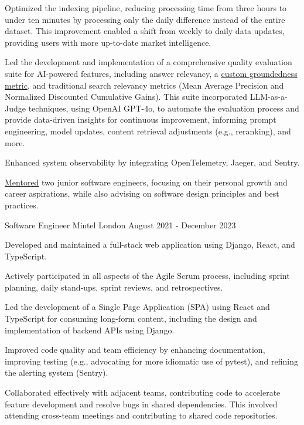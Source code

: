 \documentclass[11pt, a4paper]{awesome-cv}
\begin{document}
\begin{cventries}
{\begin{cvitems}
        \item {Optimized the indexing pipeline, reducing processing time from three hours to under ten minutes by processing only the daily difference instead of the entire dataset. This improvement enabled a shift from weekly to daily data updates, providing users with more up-to-date market intelligence.}
        \item {Led the development and implementation of a comprehensive quality evaluation suite for AI-powered features, including answer relevancy, a \href{https://leverstone.me/blog/automating-groundedness-evaluation-in-rag-applications}{custom groundedness metric}, and traditional search relevancy metrics (Mean Average Precision and Normalized Discounted Cumulative Gains). This suite incorporated LLM-as-a-Judge techniques, using OpenAI GPT-4o, to automate the evaluation process and provide data-driven insights for continuous improvement, informing prompt engineering, model updates, content retrieval adjustments (e.g., reranking), and more.}
        \item {Enhanced system observability by integrating OpenTelemetry, Jaeger, and Sentry.}
        \item {\href{https://leverstone.me/blog/mentoring-toolkit}{Mentored} two junior software engineers, focusing on their personal growth and career aspirations, while also advising on software design principles and best practices.}
      \end{cvitems}
    }

  \cventry
    {Software Engineer}
    {Mintel}
    {London}
    {August 2021 - December 2023}
    {
      \begin{cvitems}
        \item {Developed and maintained a full-stack web application using Django, React, and TypeScript.}
        \item {Actively participated in all aspects of the Agile Scrum process, including sprint planning, daily stand-ups, sprint reviews, and retrospectives.}
        \item {Led the development of a Single Page Application (SPA) using React and TypeScript for consuming long-form content, including the design and implementation of backend APIs using Django.}
        \item {Improved code quality and team efficiency by enhancing documentation, improving testing (e.g., advocating for more idiomatic use of pytest), and refining the alerting system (Sentry).}
        \item {Collaborated effectively with adjacent teams, contributing code to accelerate feature development and resolve bugs in shared dependencies. This involved attending cross-team meetings and contributing to shared code repositories.}
      \end{cvitems}
    }


\end{cventries}
\end{document}
